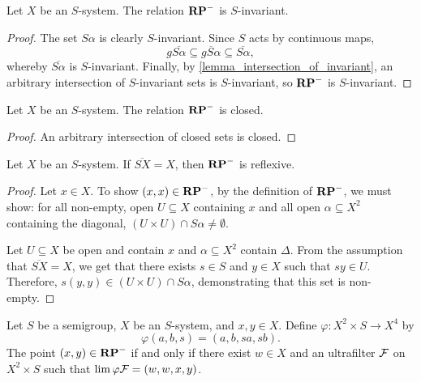 \begin{lemma}
    \label{lemma_rp_basics_invariant}
    \leanok{}
    Let $X$ be an $S$-system.  The relation $\mathbf{RP}^-$ is $S$-invariant.
\end{lemma}

\begin{proof}
\leanok{}
    The set $S\alpha$ is clearly $S$-invariant.  Since $S$ acts by continuous maps,
        \[g \overline{S\alpha} \subseteq \overline{gS \alpha} \subseteq \overline{S \alpha},\]
    whereby $\overline{S\alpha}$ is $S$-invariant.  Finally, by \cref{lemma_intersection_of_invariant}, an arbitrary intersection of $S$-invariant sets is $S$-invariant, so $\mathbf{RP}^-$ is $S$-invariant.
\end{proof}

\begin{lemma}
\label{lemma_rp_basics_closed}
\leanok{}
    Let $X$ be an $S$-system.  The relation $\mathbf{RP}^-$ is closed.
\end{lemma}

\begin{proof}
\leanok{}
    An arbitrary intersection of closed sets is closed. 
\end{proof}

\begin{lemma}
\label{lemma_rp_reflexive}
\leanok{}
    Let $X$ be an $S$-system.  If $\overline{SX} = X$, then $\mathbf{RP}^-$ is reflexive.
\end{lemma}

\begin{proof}
\leanok{}
    Let $x \in X$.  To show $(x,x) \in \mathbf{RP}^-$, by the definition of $\mathbf{RP}^-$, we must show: for all non-empty, open $U \subseteq X$ containing $x$ and all open $\alpha \subseteq X^2$ containing the diagonal, $(U \times U) \cap S\alpha \neq \emptyset$.

    Let $U \subseteq X$ be open and contain $x$ and $\alpha \subseteq X^2$ contain $\Delta$.  From the assumption that $\overline{SX} = X$, we get that there exists $s \in S$ and $y \in X$ such that $sy \in U$.  Therefore, $s(y,y) \in (U \times U) \cap S \alpha$, demonstrating that this set is non-empty. 
\end{proof}

\begin{lemma}
\label{lemma_rp_implies_ultra}
\leanok{}
    Let $S$ be a semigroup, $X$ be an $S$-system, and $x, y \in X$. Define $\varphi: X^2 \times S \to X^4$ by
    \[\varphi (a, b, s) = (a, b, sa, sb).\]
    The point $(x,y) \in \mathbf{RP}^-$ if and only if there exist $w \in X$ and an ultrafilter $\mathcal{F}$ on $X^2 \times S$ such that $\lim \varphi \mathcal{F} = (w,w,x,y)$.
\end{lemma}

